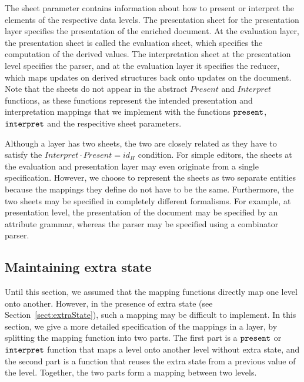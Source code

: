 The sheet parameter contains information about how to present or interpret the elements of the respective data levels. The presentation sheet for the presentation layer specifies the presentation of the enriched document. At the evaluation layer, the presentation sheet is called the evaluation sheet, which specifies the computation of the derived values. The interpretation sheet at the presentation level specifies the parser, and at the evaluation layer it specifies the reducer, which maps updates on derived structures back onto updates on the document. Note that the sheets do not appear in the abstract $Present$ and $Interpret$ functions, as these functions represent the intended presentation and interpretation mappings that we implement with the functions 
${\tt present}$, ${\tt interpret}$ and the respecitive sheet parameters.

Although a layer has two sheets, the two are closely related as they have to satisfy the
$Interpret \cdot Present = id_{H}$ condition. For simple editors, the sheets at the evaluation and presentation layer may even originate from a single specification. However, we choose to represent the sheets as two separate entities because the mappings they define do not have to be the same.  Furthermore, the two sheets may be specified in completely different formalisms. For example, at presentation level, the presentation of the document may be specified by an attribute grammar, whereas the parser may be specified using a combinator parser\cite{combinatorparser}.



%																
%																
%																
\subsection{Maintaining extra state} \label{sect:maintainingExtraState}

Until this section, we assumed that the mapping functions directly map one level onto another. However, in the presence of extra state (see Section~\ref{sect:extraState}), such a mapping may be difficult to implement. In this section, we give a more detailed specification of the mappings in a layer, by splitting the mapping function into two parts. The first part is a ${\tt present}$ or ${\tt interpret}$ function that maps a level onto another level without extra state, and the second part is a function that reuses the extra state from a previous value of the level. Together, the two parts form a mapping between two levels.


